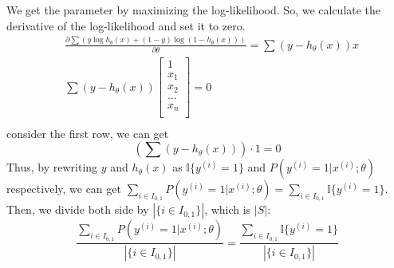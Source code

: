 \begin{answer}
We get the parameter by maximizing the log-likelihood. So, we calculate the derivative of the log-likelihood and set it to zero.
\begin{align*}
    &\frac{\partial \sum (y\log h_\theta(x) + (1 - y)\log(1 - h_\theta(x)) )}{\partial \theta} = \sum (y - h_\theta(x))x\\
    &\sum(y - h_\theta(x)) \begin{bmatrix} 1 \\ x_1 \\ x_2\\ ...\\ x_n\\\end{bmatrix} = 0\\
\end{align*}
consider the first row, we can get $$(\sum(y - h_\theta(x)) )\cdot 1 = 0$$
Thus, by rewriting $y$ and $h_\theta(x)$ as $\mathbb{I}\{y^{(i)}=1\}$ and $P(y^{(i)}=1|x^{(i)};\theta)$ respectively, we can get $\sum_{i\in I_{0, 1}}P(y^{(i)}=1|x^{(i)};\theta)=\sum_{i\in I_{0, 1}}\mathbb{I}\{y^{(i)}=1\}$. Then, we divide both side by $|\{i\in I_{0,1}\}|$, which is $|S|$:
$$\frac{\sum_{i\in I_{0, 1}}P(y^{(i)}=1|x^{(i)};\theta)}{|\{i\in I_{0,1}\}|} = \frac{\sum_{i\in I_{0, 1}}\mathbb{I}\{y^{(i)}=1\}}{|\{i\in I_{0,1}\}|}$$
\end{answer}
